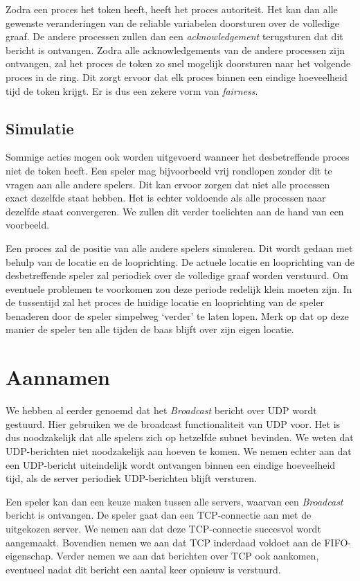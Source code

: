 \documentclass[a4paper,11pt]{article}
\begin{document}
    Zodra een proces het token heeft, heeft het proces autoriteit. Het kan dan alle gewenste veranderingen van de reliable variabelen doorsturen over de volledige graaf. De andere processen zullen dan een \emph{acknowledgement} terugsturen dat dit bericht is ontvangen. Zodra alle acknowledgements van de andere processen zijn ontvangen, zal het proces de token zo snel mogelijk doorsturen naar het volgende proces in de ring. Dit zorgt ervoor dat elk proces binnen een eindige hoeveelheid tijd de token krijgt. Er is dus een zekere vorm van \emph{fairness}.
        
    \subsection{Simulatie}
    Sommige acties mogen ook worden uitgevoerd wanneer het desbetreffende proces niet de token heeft. Een speler mag bijvoorbeeld vrij rondlopen zonder dit te vragen aan alle andere spelers. Dit kan ervoor zorgen dat niet alle processen exact dezelfde staat hebben. Het is echter voldoende als alle processen naar dezelfde staat convergeren. We zullen dit verder toelichten aan de hand van een voorbeeld.
    
    Een proces zal de positie van alle andere spelers simuleren. Dit wordt gedaan met behulp van de locatie en de looprichting. De actuele locatie en looprichting van de desbetreffende speler zal periodiek over de volledige graaf worden verstuurd. Om eventuele problemen te voorkomen zou deze periode redelijk klein moeten zijn. In de tussentijd zal het proces de huidige locatie en looprichting van de speler benaderen door de speler simpelweg `verder' te laten lopen. Merk op dat op deze manier de speler ten alle tijden de baas blijft over zijn eigen locatie.

    \section{Aannamen}
    We hebben al eerder genoemd dat het \emph{Broadcast} bericht over UDP wordt gestuurd. Hier gebruiken we de broadcast functionaliteit van UDP voor. Het is dus noodzakelijk dat alle spelers zich op hetzelfde subnet bevinden. We weten dat UDP-berichten niet noodzakelijk aan hoeven te komen. We nemen echter aan dat een UDP-bericht uiteindelijk wordt ontvangen binnen een eindige hoeveelheid tijd, als de server periodiek UDP-berichten blijft versturen.

    Een speler kan dan een keuze maken tussen alle servers, waarvan een \emph{Broadcast} bericht is ontvangen. De speler gaat dan een TCP-connectie aan met de uitgekozen server. We nemen aan dat deze TCP-connectie succesvol wordt aangemaakt. Bovendien nemen we aan dat TCP inderdaad voldoet aan de FIFO-eigenschap. Verder nemen we aan dat berichten over TCP ook aankomen, eventueel nadat dit bericht een aantal keer opnieuw is verstuurd.
\end{document}
